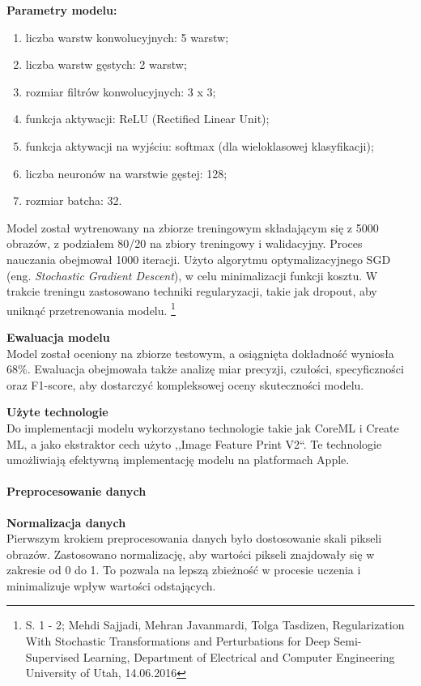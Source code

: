 \documentclass[12pt, a4paper, twoside, openany]{book}
\newcommand{\forceindent}{\leavevmode{\parindent=1.3em\indent}}
\begin{document}
\textbf{Parametry modelu:}
\begin{enumerate}[label=--]
    \item liczba warstw konwolucyjnych: 5 warstw;
    \item liczba warstw gęstych: 2 warstw;
    \item rozmiar filtrów konwolucyjnych: 3 x 3;
    \item funkcja aktywacji: ReLU (Rectified Linear Unit);
    \item funkcja aktywacji na wyjściu: softmax (dla wieloklasowej klasyfikacji);
    \item liczba neuronów na warstwie gęstej: 128;
    \item rozmiar batcha: 32.
\end{enumerate}

Model został wytrenowany na zbiorze treningowym składającym się z 5000 obrazów, z podziałem 80/20 na zbiory treningowy i walidacyjny.
Proces nauczania obejmował 1000 iteracji.
Użyto algorytmu optymalizacyjnego SGD (eng. \textit{Stochastic Gradient Descent}), w celu minimalizacji funkcji kosztu.
W trakcie treningu zastosowano techniki regularyzacji, takie jak dropout, aby uniknąć przetrenowania modelu. \footnote{
    S. 1 - 2; Mehdi Sajjadi, Mehran Javanmardi, Tolga Tasdizen, Regularization With Stochastic Transformations and Perturbations for Deep Semi-Supervised Learning, Department of Electrical and Computer Engineering University of Utah, 14.06.2016
}

\textbf{Ewaluacja modelu\\}
\forceindent Model został oceniony na zbiorze testowym, a osiągnięta dokładność wyniosła 68\%. 
Ewaluacja obejmowała także analizę miar precyzji, czułości, specyficzności oraz F1-score, aby dostarczyć kompleksowej oceny skuteczności modelu.

\textbf{Użyte technologie\\}
\forceindent Do implementacji modelu wykorzystano technologie takie jak CoreML i Create ML, a jako ekstraktor cech użyto ,,Image Feature Print V2``. 
Te technologie umożliwiają efektywną implementację modelu na platformach Apple.

\paragraph{Preprocesowanie danych\\}
\forceindent \textbf{ Normalizacja danych\\}
\indent Pierwszym krokiem preprocesowania danych było dostosowanie skali pikseli obrazów.
Zastosowano normalizację, aby wartości pikseli znajdowały się w zakresie od 0 do 1.
To pozwala na lepszą zbieżność w procesie uczenia i minimalizuje wpływ wartości odstających.
\end{document}
